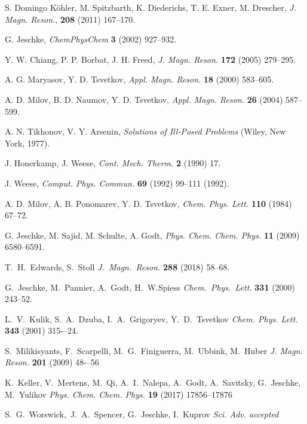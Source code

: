 \documentclass{article}
\begin{document}
\begin{thebibliography}{00}
S. Domingo K\"ohler, M. Spitzbarth, K. Diederichs, T. E. Exner, M. Drescher,
{\em J. Magn. Reson.}, {\bf 208} (2011) 167--170.

G. Jeschke,
{\em ChemPhysChem} {\bf 3} (2002) 927--932.

Y. W. Chiang, P. P. Borbat, J. H. Freed,
{\em J. Magn. Reson.} {\bf 172} (2005) 279--295.

A. G. Maryasov, Y. D. Tsvetkov, 
{\em Appl. Magn. Reson.} {\bf 18} (2000) 583--605.

A. D. Milov, B. D. Naumov, Y. D. Tsvetkov,
{\em Appl. Magn. Reson.} {\bf 26} (2004) 587--599.

A. N. Tikhonov, V. Y. Arsenin, 
{\em Solutions of Ill-Posed Problems} (Wiley, New York, 1977).

J. Honerkamp, J. Weese,
{\em Cont. Mech. Therm.} {\bf 2} (1990) 17.

J. Weese,
{\em Comput. Phys. Commun.} {\bf 69} (1992) 99--111 (1992).

A. D. Milov, A. B. Ponomarev, Y. D. Tsvetkov,
{\em Chem. Phys. Lett.} {\bf 110} (1984) 67--72.

G. Jeschke, M. Sajid, M. Schulte, A. Godt,
{\em Phys. Chem. Chem. Phys.} {\bf 11} (2009) 6580--6591.

T.~H.~Edwards, S.~Stoll
{\em J.~Magn.~Reson.} {\bf 288} (2018) 58--68.

G.~Jeschke, M.~Pannier, A.~Godt, H.~W.Spiess
{\em Chem.~Phys.~Lett.} {\bf 331} (2000) 243--52.

L.~V.~Kulik, S.~A.~Dzuba, I.~A.~Grigoryev, Y.~D.~Tsvetkov 
{\em Chem. Phys. Lett.} {\bf 343} (2001) 315-–24.

S.~Milikisyants, F.~Scarpelli, M.~G.~Finiguerra, M.~Ubbink, M.~Huber 
{\em J. Magn. Reson.} {\bf 201} (2009) 48-–56

K.~Keller, V.~Mertens, M.~Qi, A.~I.~Nalepa, A.~Godt, A.~Savitsky, G.~Jeschke, M.~Yulikov 
{\em Phys. Chem. Chem. Phys.} {\bf 19} (2017) 17856--17876

S.~G.~Worswick,~J.~A.~Spencer, G.~Jeschke, I.~Kuprov
{\em Sci. Adv.} {\em accepted}


\end{thebibliography}
\end{document}
